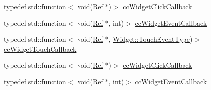 \begin{DoxyCompactItemize}
\item 
typedef std\+::function$<$ void(\hyperlink{classRef}{Ref} $\ast$)$>$ \hyperlink{classui_1_1Widget_a01110bd071334e41c48ee0bec593db61}{cc\+Widget\+Click\+Callback}
\item 
typedef std\+::function$<$ void(\hyperlink{classRef}{Ref} $\ast$, int)$>$ \hyperlink{classui_1_1Widget_a15b83a56c3c29442ec103100b45e56c7}{cc\+Widget\+Event\+Callback}
\item 
typedef std\+::function$<$ void(\hyperlink{classRef}{Ref} $\ast$, \hyperlink{classui_1_1Widget_a4829c0f1cbaf1fd820a9b2ccf0c58c73}{Widget\+::\+Touch\+Event\+Type})$>$ \hyperlink{classui_1_1Widget_a4f2987649ba5a33d1edb8b13279b03c9}{cc\+Widget\+Touch\+Callback}
\item 
typedef std\+::function$<$ void(\hyperlink{classRef}{Ref} $\ast$)$>$ \hyperlink{classui_1_1Widget_a01110bd071334e41c48ee0bec593db61}{cc\+Widget\+Click\+Callback}
\item 
typedef std\+::function$<$ void(\hyperlink{classRef}{Ref} $\ast$, int)$>$ \hyperlink{classui_1_1Widget_a15b83a56c3c29442ec103100b45e56c7}{cc\+Widget\+Event\+Callback}
\end{DoxyCompactItemize}
